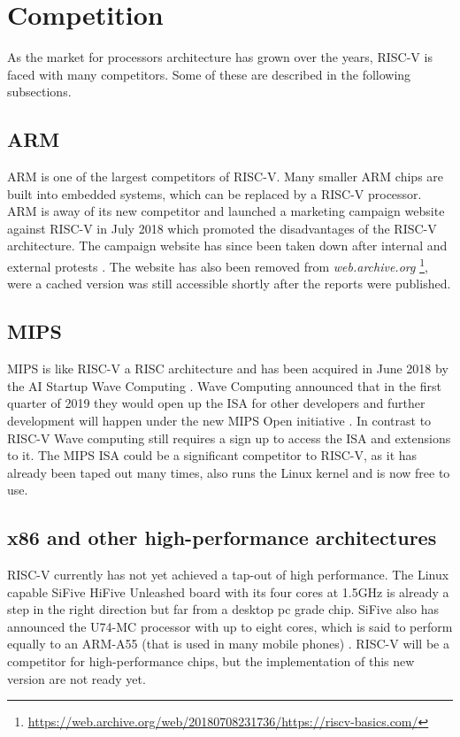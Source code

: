 \section{Competition}
As the market for processors architecture has grown
over the years, RISC-V is faced with many competitors.
Some of these are described in the following subsections.

\subsection{ARM}
ARM is one of the largest competitors of RISC-V. Many
smaller ARM chips are built into embedded systems, which
can be replaced by a RISC-V processor.
ARM is away of its new competitor and launched a marketing campaign
website against RISC-V in July 2018 which promoted the
disadvantages of the RISC-V architecture.
The campaign website has since been taken down after
internal and external protests \cite{theregister_arm_campaign_risc-v}.
The website has also been removed from \textit{web.archive.org}
\footnote{\url{https://web.archive.org/web/20180708231736/https://riscv-basics.com/}},
were a cached version was still accessible shortly after the
reports were published.

\subsection{MIPS}
MIPS is like RISC-V a RISC architecture and has been acquired in
June 2018 by the AI Startup Wave Computing
\cite{top500_mips_acquired}. Wave Computing announced that in
the first quarter of 2019 they would open up the ISA for other developers and further
development will happen under the new MIPS Open initiative
\cite{wavecomputing_mips_open}.
In contrast to RISC-V Wave computing still requires a sign up
to access the ISA and extensions to it.
The MIPS ISA could be a significant competitor to RISC-V,
as it has already been taped out many times, also runs
the Linux kernel and is now free to use.

\subsection{x86 and other high-performance architectures}
RISC-V currently has not yet achieved a tap-out of
high performance. The Linux capable SiFive HiFive Unleashed board with
its four cores at 1.5GHz 
\cite{risc-v_sifive_hifive} is already a step in the right
direction but far from a desktop pc grade chip.
SiFive also has announced the U74-MC processor with up to eight cores,
which is said to perform equally to an ARM-A55 (that is used in many
mobile phones) \cite{linuxgizmos_sifive_u74}.
RISC-V will be a competitor for high-performance
chips, but the implementation of this new version are
not ready yet.